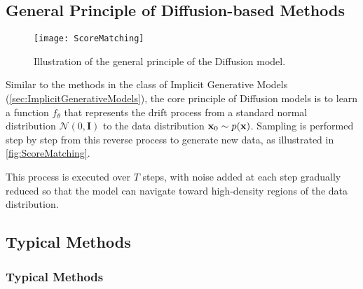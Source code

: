 \subsection{General Principle of Diffusion-based Methods}

\begin{figure}[H]
	\centering
	\texttt{[image: ScoreMatching]}
	\caption{Illustration of the general principle of the Diffusion model.}
	\label{fig:ScoreMatching}
\end{figure}

Similar to the methods in the class of Implicit Generative Models (\autoref{sec:ImplicitGenerativeModels}), the core principle of Diffusion models is to learn a function $f_{\theta}$ that represents the drift process from a standard normal distribution $\mathcal{N}(0, \mathbf{I})$ to the data distribution $\mathbf{x}_{0} \sim p(\mathbf{x})$. Sampling is performed step by step from this reverse process to generate new data, as illustrated in \autoref{fig:ScoreMatching}.

This process is executed over $T$ steps, with noise added at each step gradually reduced so that the model can navigate toward high-density regions of the data distribution.

\subsection{Typical Methods}
\label{subsec:TypicalMethod}


\subsubsection{Typical Methods}

